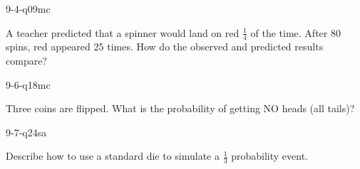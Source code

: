 \begin{practiceQuestion}{9-4-q09}{mc}
\begin{questionText}
A teacher predicted that a spinner would land on red $\frac{1}{4}$ of the time. After $80$ spins, red appeared $25$ times. How do the observed and predicted results compare?
\end{questionText}
\end{practiceQuestion}

\begin{practiceQuestion}{9-6-q18}{mc}
\begin{questionText}
Three coins are flipped. What is the probability of getting NO heads (all tails)?
\end{questionText}
\end{practiceQuestion}

\begin{practiceQuestion}{9-7-q24}{sa}
\begin{questionText}
Describe how to use a standard die to simulate a $\frac{1}{3}$ probability event.
\end{questionText}
\end{practiceQuestion}
